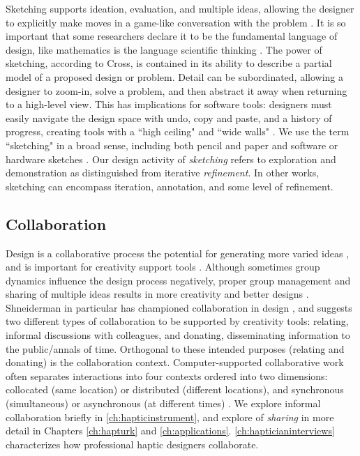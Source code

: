 Sketching supports ideation, evaluation, and multiple ideas,
allowing the designer to
explicitly make moves in a game-like conversation with the problem \cite{Schon1982}.
It is so important that some researchers declare it to be the fundamental language of design, like mathematics is  the language  scientific thinking \cite{Cross2006}.
The power of sketching, according to Cross, is contained in its ability to describe a partial model of a proposed design or problem.
Detail can be subordinated, allowing a designer to zoom-in, solve a problem, and then
abstract it away when returning to a high-level view.
This has implications for software tools: designers must easily navigate the design space with undo, copy and paste, and a history of progress, creating tools with a ``high ceiling" and ``wide walls" \cite{Resnick2008}.
We use the term ``sketching" in a broad sense, including both pencil and paper and software or hardware sketches \cite{Moussette2010,Buxton2007}.
Our design activity of \emph{sketching} refers to exploration and demonstration as distinguished from iterative \emph{refinement}.
In other works, sketching can encompass iteration, annotation, and some level of refinement.

\subsection{Collaboration}
Design is a collaborative process
 the potential for generating more varied ideas \cite{Warr2005} , and is important for creativity support tools \cite{Resnick2008,Shneiderman2000}.
Although sometimes group dynamics influence the design process negatively, proper group management and sharing of multiple ideas results in more creativity and better designs \cite{Herring2009}.
Shneiderman in particular has championed collaboration in design \cite{Shneiderman2000}, and suggests two different types of collaboration to be supported by creativity tools: relating, informal discussions with colleagues, and donating, disseminating information to the public/annals of time.
Orthogonal to these intended purposes (relating and donating) is the collaboration context.
Computer-supported collaborative work often separates interactions into four contexts ordered into two dimensions: collocated (same location) or distributed (different locations), and synchronous (simultaneous)  or asynchronous (at different times) \cite{Ellis1991}.
We explore informal collaboration briefly in \autoref{ch:hapticinstrument}, and explore  of \emph{sharing} in more detail in Chapters \ref{ch:hapturk} and \ref{ch:applications}.
\autoref{ch:hapticianinterviews} characterizes how professional haptic designers collaborate.


